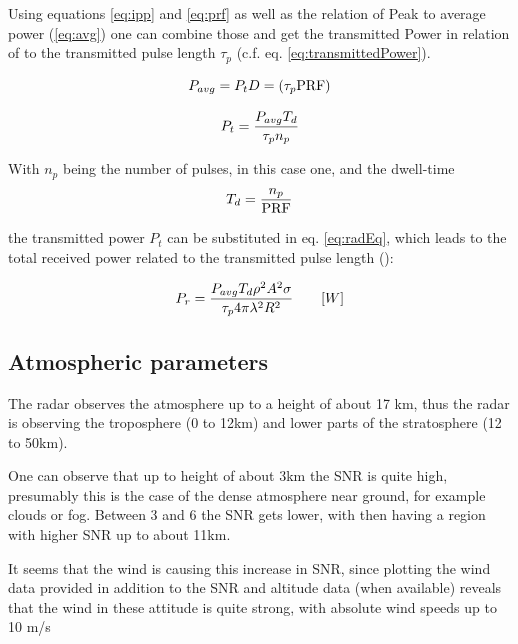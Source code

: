Using equations \ref{eq:ipp} and \ref{eq:prf} as well as the relation of Peak to average power (\ref{eq:avg}) one can combine those and get the transmitted Power in relation of to the transmitted pulse length $\tau_p$ (c.f. eq. \ref{eq:transmittedPower}).

\begin{equation}
	\centering
	\label{eq:avg}
	P_{avg} = P_t D = (\tau_p \textrm{PRF} )
\end{equation}

\begin{equation}
	\centering
	\label{eq:transmittedPower}
	P_{t} = \frac{P_{avg} T_d}{\tau_p n_p} 
\end{equation}

With $n_p$ being the number of pulses, in this case one, and the dwell-time 
\begin{equation}
	\label{eq:dwell}
	\centering
	T_d = \frac{n_p}{\textrm{PRF}}
\end{equation}

the transmitted power $P_t$ can be substituted in eq. \ref{eq:radEq}, which leads to the total received power related to the transmitted pulse length (\citep[c.f.][chap. 2.10]{richards2010principles}):


\begin{equation}
	\label{eq:relation}
	\centering
	P_r = \frac{P_{avg} T_d \rho^2 A^2 \sigma }{\tau_p 4 \pi \lambda^2 R^2} \qquad	[W]
\end{equation}

\subsection{Atmospheric parameters}

The radar observes the atmosphere up to a height of about 17 km, thus the radar is observing the troposphere (0 to 12km) and lower parts of the stratosphere (12 to 50km).

One can observe that up to height of about 3km the SNR is quite high, presumably this is the case of the dense atmosphere near ground, for example clouds or fog. Between 3 and 6 the SNR gets lower, with then having a region with higher SNR up to about 11km.

It seems that the wind is causing this increase in SNR, since plotting the wind data provided in addition to the SNR and altitude data (when available) reveals that the wind in these attitude is quite strong, with absolute wind speeds up to 10 m/s


